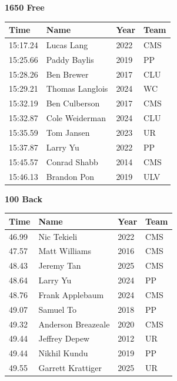 \vspace{1.2em}
\noindent\begin{minipage}[t]{0.98\textwidth}
\centering
\textbf{\textcolor{teamprimary}{1650 Free}}\par
\vspace{0.5em}
\centering
\small
\renewcommand{\arraystretch}{1.0}
\setlength{\tabcolsep}{4pt}
\begin{tabular}{@{}p{2.5cm}p{4.5cm}p{1.5cm}p{2.5cm}@{}}
\toprule
\textbf{Time} & \textbf{Name} & \textbf{Year} & \textbf{Team} \\
\midrule
15:17.24 & Lucas Lang & 2022 & CMS \\
15:25.66 & Paddy Baylis & 2019 & PP \\
15:28.26 & Ben Brewer & 2017 & CLU \\
15:29.21 & Thomas Langlois & 2024 & WC \\
15:32.19 & Ben Culberson & 2017 & CMS \\
15:32.87 & Cole Weiderman & 2024 & CLU \\
15:35.59 & Tom Jansen & 2023 & UR \\
15:37.87 & Larry Yu & 2022 & PP \\
15:45.57 & Conrad Shabb & 2014 & CMS \\
15:46.13 & Brandon Pon & 2019 & ULV \\
\bottomrule
\end{tabular}
\end{minipage}
\vspace{1.2em}
\noindent\begin{minipage}[t]{0.98\textwidth}
\centering
\textbf{\textcolor{teamprimary}{100 Back}}\par
\vspace{0.5em}
\centering
\small
\renewcommand{\arraystretch}{1.0}
\setlength{\tabcolsep}{4pt}
\begin{tabular}{@{}p{2.5cm}p{4.5cm}p{1.5cm}p{2.5cm}@{}}
\toprule
\textbf{Time} & \textbf{Name} & \textbf{Year} & \textbf{Team} \\
\midrule
46.99 & Nic Tekieli & 2022 & CMS \\
47.57 & Matt Williams & 2016 & CMS \\
48.43 & Jeremy Tan & 2025 & CMS \\
48.64 & Larry Yu & 2024 & PP \\
48.76 & Frank Applebaum & 2024 & CMS \\
49.07 & Samuel To & 2018 & PP \\
49.32 & Anderson Breazeale & 2020 & CMS \\
49.44 & Jeffrey Depew & 2012 & UR \\
49.44 & Nikhil Kundu & 2019 & PP \\
49.55 & Garrett Krattiger & 2025 & UR \\
\bottomrule
\end{tabular}
\end{minipage}
